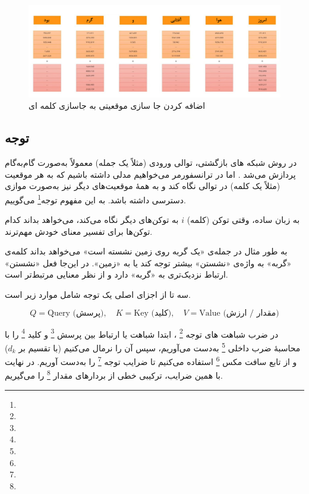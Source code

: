 \begin{figure}[h]
	\centering
	\begin{minipage}[b]{0.7\textwidth}
		\centering
		\includegraphics[width=\textwidth]{transformer_images/persian images/persian_images/b17.png}
		\caption{اضافه کردن جا سازی موقعیتی به جاسازی کلمه ای}
		\label{fig:word_embedding_positional_embedding}
	\end{minipage}
	\hfill
\end{figure}


\subsection{توجه}



در روش‌ شبکه های بازگشتی، توالی ورودی (مثلاً یک جمله) معمولاً به‌صورت گام‌به‌گام پردازش می‌شد \cite{elman1990finding,hochreiter1997long}. اما در ترانسفورمر می‌خواهیم مدلی داشته باشیم که به هر موقعیت (مثلاً یک کلمه) در توالی نگاه کند و به همهٔ موقعیت‌های دیگر نیز به‌صورت موازی دسترسی داشته باشد. به این مفهوم توجه\footnote{} می‌گوییم.

به زبان ساده، وقتی توکن (کلمه) \( i \) به توکن‌های دیگر نگاه می‌کند، می‌خواهد بداند کدام توکن‌ها برای تفسیر معنای خودش مهم‌ترند.

به طور مثال در جمله‌ی «یک گربه روی زمین نشسته است» می‌خواهد بداند کلمه‌ی «گربه» به واژه‌ی «نشستن» بیشتر توجه کند یا به «زمین». در این‌جا فعل «نشستن» ارتباط نزدیک‌تری به «گربه» دارد و از نظر معنایی مرتبط‌تر است.


سه تا از اجزای اصلی یک توجه شامل موارد زیر است.

\[
Q = \text{Query (پرسش)}, \quad K = \text{Key (کلید)}, \quad V = \text{Value (مقدار / ارزش)}
\]





در  ضرب شباهت های توجه \footnote{}    \cite{vaswani2017attention}، ابتدا شباهت یا ارتباط بین پرسش \footnote{} و کلید \footnote{} را با محاسبهٔ ضرب داخلی \footnote{} به‌دست می‌آوریم، سپس آن را نرمال می‌کنیم (با تقسیم بر \( d_k \)) و از تابع سافت مکس \footnote{} استفاده می‌کنیم تا ضرایب توجه \footnote{} را به‌دست آوریم. در نهایت با همین ضرایب، ترکیبی خطی از بردارهای مقدار \footnote{} را می‌گیریم.

